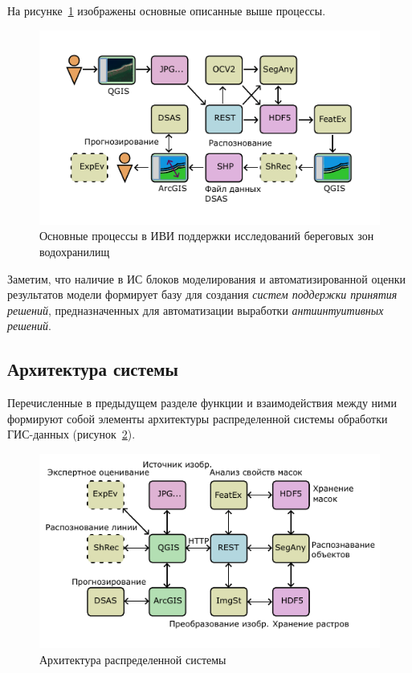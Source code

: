 \documentclass[732,14pt,final]{studrep}
\begin{document}
На рисунке~\ref{fig:processes} изображены основные описанные выше процессы.
\begin{center}
  \begin{figure}[htp]
    \includegraphics[width=\linewidth]{pics/tech.pdf}
    \caption{Основные процессы в ИВИ поддержки исследований береговых зон водохранилищ}\label{fig:processes}
  \end{figure}
\end{center}

Заметим, что наличие в ИС блоков моделирования и автоматизированной оценки результатов модели формирует базу для создания \emph{систем поддержки принятия решений}, предназначенных для автоматизации выработки \emph{антиинтуитивных решений}.

\subsection{Архитектура системы}
Перечисленные в предыдущем разделе функции и взаимодействия между ними формируют собой элементы архитектуры распределенной системы обработки ГИС-данных (рисунок~\ref{fig:arch}).

\begin{center}
\begin{figure}[htp]
\includegraphics[width=\linewidth]{pics/arch-p.pdf}
  \caption{Архитектура распределенной системы} \label{fig:arch}
\end{figure}
\end{center}
\end{document}
